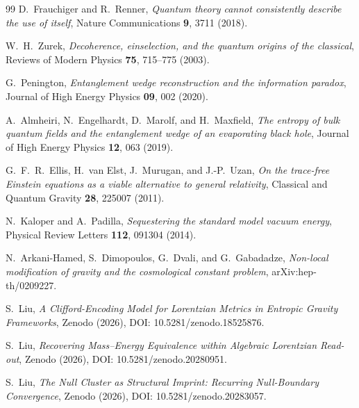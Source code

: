 \documentclass[12pt,a4paper]{article}
\theoremstyle{definition}
\theoremstyle{remark}
\begin{document}
\begin{thebibliography}{99}
D.~Frauchiger and R.~Renner, \emph{Quantum theory cannot consistently describe the use of itself}, Nature Communications \textbf{9}, 3711 (2018).

W.~H.~Zurek, \emph{Decoherence, einselection, and the quantum origins of the classical}, Reviews of Modern Physics \textbf{75}, 715--775 (2003).

G.~Penington, \emph{Entanglement wedge reconstruction and the information paradox}, Journal of High Energy Physics \textbf{09}, 002 (2020).

A.~Almheiri, N.~Engelhardt, D.~Marolf, and H.~Maxfield, \emph{The entropy of bulk quantum fields and the entanglement wedge of an evaporating black hole}, Journal of High Energy Physics \textbf{12}, 063 (2019).

G.~F.~R.~Ellis, H.~van Elst, J.~Murugan, and J.-P.~Uzan, \emph{On the trace-free Einstein equations as a viable alternative to general relativity}, Classical and Quantum Gravity \textbf{28}, 225007 (2011).

N.~Kaloper and A.~Padilla, \emph{Sequestering the standard model vacuum energy}, Physical Review Letters \textbf{112}, 091304 (2014).

N.~Arkani-Hamed, S.~Dimopoulos, G.~Dvali, and G.~Gabadadze, \emph{Non-local modification of gravity and the cosmological constant problem}, arXiv:hep-th/0209227.

S.~Liu, \emph{A Clifford-Encoding Model for Lorentzian Metrics in Entropic Gravity Frameworks}, Zenodo (2026), DOI: 10.5281/zenodo.18525876.

S.~Liu, \emph{Recovering Mass--Energy Equivalence within Algebraic Lorentzian Read-out}, Zenodo (2026), DOI: 10.5281/zenodo.20280951.

S.~Liu, \emph{The Null Cluster as Structural Imprint: Recurring Null-Boundary Convergence}, Zenodo (2026), DOI: 10.5281/zenodo.20283057.

\end{thebibliography}
\end{document}
